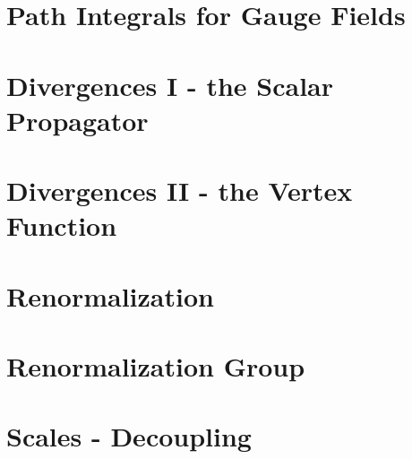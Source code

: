 \documentclass[11pt,twoside]{report}
\begin{document}
\chapter{Path Integrals for Gauge Fields}
\label{cha:path-integrals-gauge}


\chapter{Divergences I - the Scalar Propagator}
\label{cha:divergences-i-scalar}

\chapter{Divergences II - the Vertex Function}
\label{cha:diverg-ii-vert}

\chapter{Renormalization}
\label{cha:renormalization}


\chapter{Renormalization Group}
\label{cha:renorm-group}

\chapter{Scales - Decoupling}
\label{cha:scales-decoupling}

\printindex
\end{document}
